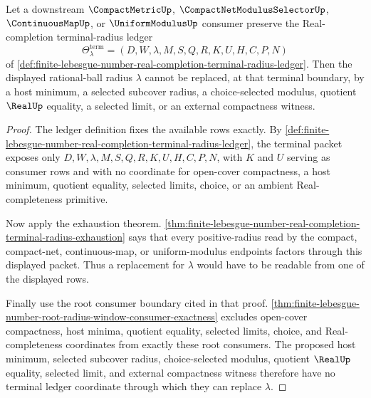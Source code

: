 \begin{theorem}
\label{thm:finite-lebesgue-number-terminal-radius-choice-refusal}
Let a downstream $\CompactMetricUp$, $\CompactNetModulusSelectorUp$, $\ContinuousMapUp$, or $\UniformModulusUp$ consumer preserve the Real-completion terminal-radius ledger
$$
\Theta_{\lambda}^{\mathrm{term}}=(D,W,\lambda,M,S,Q,R,K,U,H,C,P,N)
$$
of \autoref{def:finite-lebesgue-number-real-completion-terminal-radius-ledger}. Then the displayed rational-ball radius $\lambda$ cannot be replaced, at that terminal boundary, by a host minimum, a selected subcover radius, a choice-selected modulus, quotient $\RealUp$ equality, a selected limit, or an external compactness witness.
\end{theorem}
\begin{proof}
The ledger definition fixes the available rows exactly. By \autoref{def:finite-lebesgue-number-real-completion-terminal-radius-ledger}, the terminal packet exposes only $D,W,\lambda,M,S,Q,R,K,U,H,C,P,N$, with $K$ and $U$ serving as consumer rows and with no coordinate for open-cover compactness, a host minimum, quotient equality, selected limits, choice, or an ambient Real-completeness primitive.

Now apply the exhaustion theorem. \autoref{thm:finite-lebesgue-number-real-completion-terminal-radius-exhaustion} says that every positive-radius read by the compact, compact-net, continuous-map, or uniform-modulus endpoints factors through this displayed packet. Thus a replacement for $\lambda$ would have to be readable from one of the displayed rows.

Finally use the root consumer boundary cited in that proof. \autoref{thm:finite-lebesgue-number-root-radius-window-consumer-exactness} excludes open-cover compactness, host minima, quotient equality, selected limits, choice, and Real-completeness coordinates from exactly these root consumers. The proposed host minimum, selected subcover radius, choice-selected modulus, quotient $\RealUp$ equality, selected limit, and external compactness witness therefore have no terminal ledger coordinate through which they can replace $\lambda$.
\end{proof}
